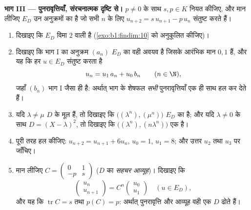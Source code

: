 \begin{problem}
\medskip \noindent\textbf{भाग III ---  पुनरावृत्तियाँ, संरचनात्मक
दृष्टि से।} $p \neq 0$ के साथ $s, p \in K$ नियत कीजिए, और मान लीजिए $E_D$ उन
अनुक्रमों का  है जो सभी $n$ के लिए $u_{n+2} = s\,u_{n+1} - p\,u_n$
संतुष्ट करते हैं।
\begin{enumerate}[resume]
  \item दिखाइए कि $E_D$ विमा $2$ वाली  है
  (\cref{exo:b1:findim:10} को अनुकूलित कीजिए)।
  \item दिखाइए कि भाग I का अनुक्रम $(a_n)$ $E_D$ का वही अवयव है जिसके आरंभिक
  मान $0, 1$ हैं, और यह कि हर $u \in E_D$ संतुष्ट करता है
        \[
        u_n = u_1\,a_n + u_0\,b_n \qquad (n \in \N),
        \]
        जहाँ $(b_n)$ भाग I जैसा ही है: अर्थात् भाग के शेषफल \emph{सभी}
        पुनरावृत्तियाँ एक ही साथ हल कर देते हैं।
  \item यदि $\lambda \neq \mu$ $D$ के मूल हैं, तो दिखाइए कि
  $\bigl((\lambda^n), (\mu^n)\bigr)$ $E_D$ का  है; और यदि $\lambda \neq
  0$ के साथ $D = (X-\lambda)^2$, तो दिखाइए कि $\bigl((\lambda^n),
  (n\lambda^n)\bigr)$ एक  है।
  \item पूरी तरह हल कीजिए: $u_{n+2} = u_{n+1} + 6u_n$, $u_0 = 1$, $u_1 = 8$;
  और उत्तर $u_2$ तथा $u_3$ पर जाँचिए।
  \item मान लीजिए $C = \begin{pmatrix} 0 & 1\\ -p & s\end{pmatrix}$ ($D$ का
  \emph{सहचर आव्यूह})। दिखाइए कि
        \[
        \begin{pmatrix} u_{n}\\ u_{n+1}\end{pmatrix}
        = C^n \begin{pmatrix} u_0\\ u_1\end{pmatrix}
        \quad (u \in E_D),
        \]
        और यह कि $\operatorname{tr} C = s$ तथा $p(C) = p$: अर्थात्
        पुनरावृत्ति और आव्यूह वही एक  $D$ ढोते हैं।
\end{enumerate}


\end{problem}
